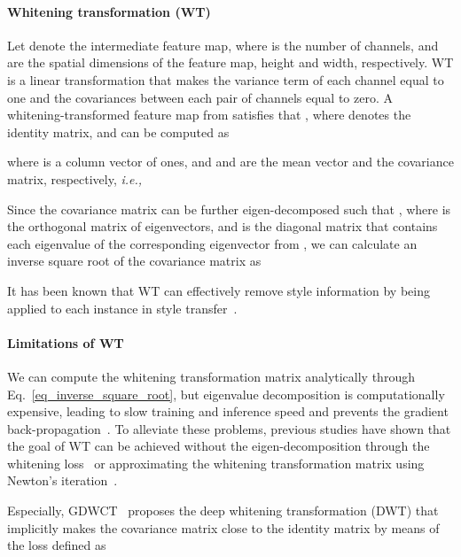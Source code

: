\documentclass[final]{latex/cvpr}
\begin{document}
\paragraph{Whitening transformation (WT)} Let  denote the intermediate feature map, where  is the number of channels,  and  are the spatial dimensions of the feature map, height and width, respectively.\vspace{0.02cm}
WT is a linear transformation that makes the variance term of each channel equal to one and the covariances between each pair of channels equal to zero.
A whitening-transformed feature map\vspace{0.05cm}
 from  satisfies that , where  denotes the identity matrix, and can be computed as

where  is a column vector of ones, and  and  are the mean vector and the covariance matrix, respectively, \textit{i.e.,} 
\vspace{-0.1cm}


Since the covariance matrix  can be further eigen-decomposed such that , where  is the orthogonal matrix of eigenvectors, and  is the diagonal matrix that contains each eigenvalue of the corresponding eigenvector from , we can calculate an inverse square root of the covariance matrix  as
\vspace{-0.05cm}

It has been known that WT can effectively remove style information by being applied to each instance in style transfer~\cite{li2017universal}.

\vspace{-0.4cm}
\paragraph{Limitations of WT}
We can compute the whitening transformation matrix  analytically through Eq.~\eqref{eq_inverse_square_root}, but eigenvalue decomposition is computationally expensive, leading to slow training and inference speed 
and prevents the gradient back-propagation~\cite{huang2018decorrelated, cho2019image}.
To alleviate these problems, previous studies have shown that the goal of WT can be achieved without the eigen-decomposition through the whitening loss~\cite{cho2019image} or approximating the whitening transformation matrix using Newton's iteration~\cite{huang2019iterative,huang2018decorrelated,pan2019switchable}.

Especially, GDWCT~\cite{cho2019image} proposes the deep whitening transformation (DWT) that implicitly makes the covariance matrix  close to the identity matrix  by means of the loss defined as
\vspace{-0.1cm}
\end{document}
